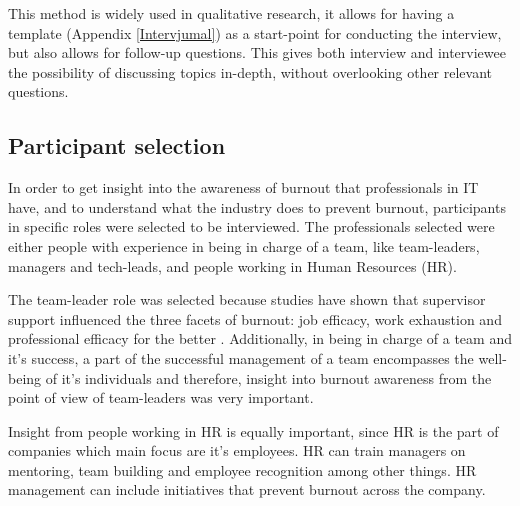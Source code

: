 This method is widely used in qualitative research, it allows for having a template (Appendix \ref{Intervjumal}) as a start-point for conducting the interview, but also allows for follow-up questions. This gives both interview and interviewee the possibility of discussing topics in-depth, without overlooking other relevant questions. 

\subsection{Participant selection}
In order to get insight into the awareness of burnout that professionals in IT have, and to understand what the industry does to prevent burnout, participants in specific roles were selected to be interviewed. The professionals selected were either people with experience in being in charge of a team, like team-leaders, managers and tech-leads, and people working in Human Resources (HR). 

The team-leader role was selected because studies have shown that supervisor support influenced the three facets of burnout: job efficacy, work exhaustion and professional efficacy for the better \parencite[9]{zaza_drivers_2021}. Additionally, in being in charge of a team and it's success, a part of the successful management of a team encompasses the well-being of it's individuals and therefore, insight into burnout awareness from the point of view of team-leaders was very important. 

Insight from people working in HR is equally important, since HR is the part of companies which main focus are it's employees. HR can train managers on mentoring, team building and employee recognition among other things. HR management can include initiatives that prevent burnout across the company. 



